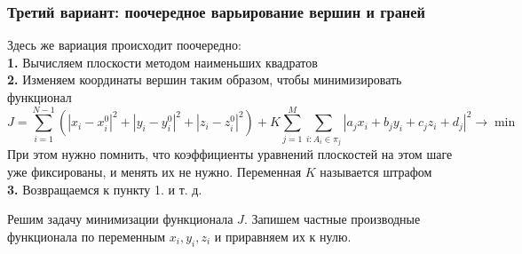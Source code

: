 \documentclass[a4paper,12pt, titlepage]{article}
\begin{document}
\subsubsection{Третий вариант: поочередное варьирование вершин и граней}
\begin{flushleft}
Здесь же вариация происходит поочередно:\\
	\textbf{1. }Вычисляем плоскости методом наименьших квадратов\\
	\textbf{2. }Изменяем координаты вершин таким образом, чтобы минимизировать функционал\\
$$	
	J = \sum\limits_{i = 1}^{N - 1}(|x_{i} - x_{i}^{0}|^{2} + |y_{i} - y_{i}^{0}|^{2} 
	+ |z_{i} - z_{i}^{0}|^{2}) + 
	K\sum\limits_{j = 1}^{M}\sum\limits_{i: A_{i} \in \pi_{j}}
	|a_{j}x_{i} + b_{j}y_{i} + c_{j}z_{i} + d_{j}|^{2} \to \min		
$$
При этом нужно помнить, что коэффициенты уравнений плоскостей на этом шаге уже фиксированы, и менять
их не нужно. Переменная $K$ называется штрафом\\
	\textbf{3. }Возвращаемся к пункту 1. и т. д.\\
\end{flushleft}

\begin{flushleft}
 Решим задачу минимизации функционала $J$. Запишем частные производные функционала по переменным 
$x_{i}, y_{i}, z_{i}$ и приравняем их к нулю.
\end{flushleft}
\end{document}
